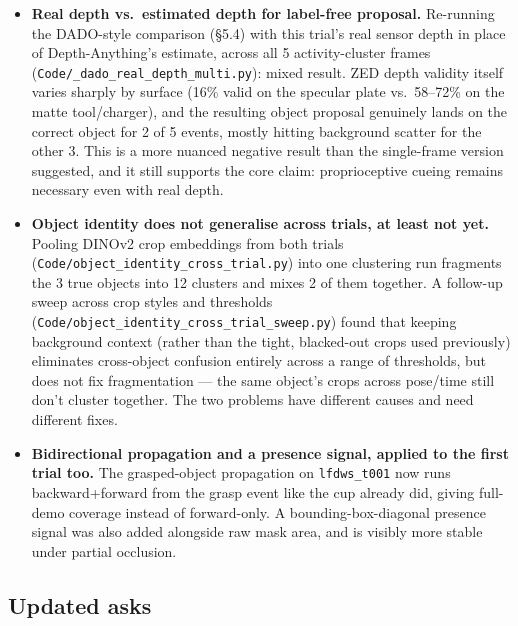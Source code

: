 \documentclass[11pt]{article}
\begin{document}
\begin{itemize}[noitemsep]
  \item \textbf{Real depth vs.\ estimated depth for label-free proposal.}
        Re-running the DADO-style comparison (\S5.4) with this trial's real
        sensor depth in place of Depth-Anything's estimate, across all 5
        activity-cluster frames (\texttt{Code/\_dado\_real\_depth\_multi.py}):
        mixed result. ZED depth validity itself varies sharply by surface
        (16\% valid on the specular plate vs.\ 58--72\% on the matte
        tool/charger), and the resulting object proposal genuinely lands on
        the correct object for 2 of 5 events, mostly hitting background
        scatter for the other 3. This is a more nuanced negative result than
        the single-frame version suggested, and it still supports the core
        claim: proprioceptive cueing remains necessary even with real depth.
  \item \textbf{Object identity does not generalise across trials, at
        least not yet.} Pooling DINOv2 crop embeddings from both trials
        (\texttt{Code/object\_identity\_cross\_trial.py}) into one clustering
        run fragments the 3 true objects into 12 clusters and mixes 2 of
        them together. A follow-up sweep across crop styles and thresholds
        (\texttt{Code/object\_identity\_cross\_trial\_sweep.py}) found that
        keeping background context (rather than the tight, blacked-out crops
        used previously) eliminates cross-object confusion entirely across a
        range of thresholds, but does not fix fragmentation --- the same
        object's crops across pose/time still don't cluster together. The
        two problems have different causes and need different fixes.
  \item \textbf{Bidirectional propagation and a presence signal, applied
        to the first trial too.} The grasped-object propagation on
        \texttt{lfdws\_t001} now runs backward+forward from the grasp
        event like the cup already did, giving full-demo coverage instead
        of forward-only. A bounding-box-diagonal presence signal was also
        added alongside raw mask area, and is visibly more stable under
        partial occlusion.
\end{itemize}

\subsection{Updated asks}
\end{document}
